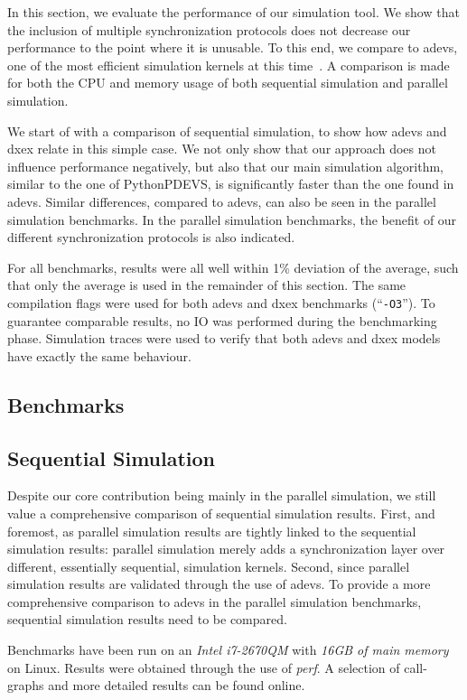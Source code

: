 In this section, we evaluate the performance of our simulation tool.
We show that the inclusion of multiple synchronization protocols does not decrease our performance to the point where it is unusable.
To this end, we compare to adevs, one of the most efficient simulation kernels at this time~\cite{DEVSSurvey}.
A comparison is made for both the CPU and memory usage of both sequential simulation and parallel simulation.

We start of with a comparison of sequential simulation, to show how adevs and dxex relate in this simple case.
We not only show that our approach does not influence performance negatively, but also that our main simulation algorithm, similar to the one of PythonPDEVS, is significantly faster than the one found in adevs.
Similar differences, compared to adevs, can also be seen in the parallel simulation benchmarks.
In the parallel simulation benchmarks, the benefit of our different synchronization protocols is also indicated.

For all benchmarks, results were all well within 1\% deviation of the average, such that only the average is used in the remainder of this section.
The same compilation flags were used for both adevs and dxex benchmarks (``\texttt{-O3}'').
To guarantee comparable results, no IO was performed during the benchmarking phase.
Simulation traces were used to verify that both adevs and dxex models have exactly the same behaviour.

\subsection{Benchmarks}

\subsection{Sequential Simulation}
Despite our core contribution being mainly in the parallel simulation, we still value a comprehensive comparison of sequential simulation results.
First, and foremost, as parallel simulation results are tightly linked to the sequential simulation results: parallel simulation merely adds a synchronization layer over different, essentially sequential, simulation kernels.
Second, since parallel simulation results are validated through the use of adevs.
To provide a more comprehensive comparison to adevs in the parallel simulation benchmarks, sequential simulation results need to be compared.

Benchmarks have been run on an \textit{Intel i7-2670QM} with \textit{16GB of main memory} on Linux.
Results were obtained through the use of \textit{perf}.
A selection of call-graphs and more detailed results can be found online.

